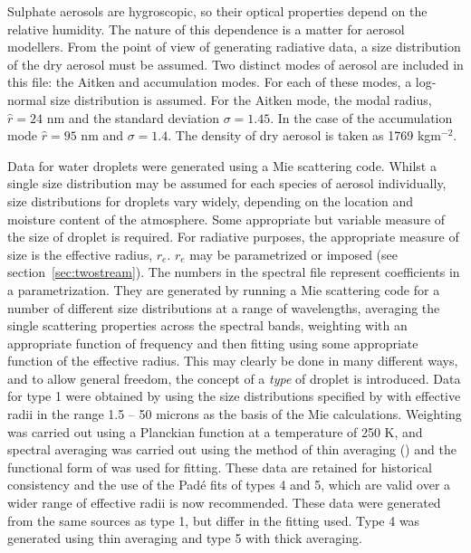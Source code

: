 \begin{enumerate}
Sulphate aerosols are hygroscopic, so their optical properties depend on
the relative humidity. The nature of this dependence is a matter for
aerosol modellers. From the point of view of generating radiative data,
a size distribution of the dry aerosol must be assumed. Two distinct
modes of aerosol are included in this file: the Aitken and accumulation
modes. For each of these modes, a log-normal size distribution is assumed.
For the Aitken mode, the modal radius, $\hat r = 24$ nm and the 
standard deviation $\sigma=1.45$. In the case of the accumulation mode
$\hat r = 95$ nm and $\sigma=1.4$. The density of dry aerosol is taken
as 1769 kgm${}^{-2}$.

Data for water droplets were generated using a Mie scattering code. 
Whilst a single size distribution may be assumed for each species
of aerosol individually, size distributions for droplets vary widely,
depending on the location and moisture content of the atmosphere. Some
appropriate but variable measure of the size of droplet is required.
For radiative purposes, the
appropriate measure of size is the effective radius, $r_e$. $r_e$
may be parametrized or imposed (see section~\ref{sec:twostream}). The numbers in the
spectral file represent coefficients in a parametrization. They
are generated by running a Mie scattering code for a number of different
size distributions at a range of wavelengths, averaging the single
scattering properties across the spectral bands, weighting with an
appropriate function of frequency and then fitting using some appropriate
function of the effective radius. This may clearly be done in many
different ways, and to allow general freedom, the concept of a {\em
type} of droplet is introduced.  Data for type 1 were obtained by
using the size distributions specified by \citet{Rockel91} 
with effective radii in the range 1.5 -- 50 microns 
as the basis of the Mie calculations. Weighting
was carried out using a Planckian function at a temperature of 250 K,
and spectral averaging was carried out using the method of 
thin averaging (\citet{Edwards96rc}) and
the functional form of \citet{Slingo82} was used for fitting. 
These data are retained for historical consistency and the use of
the Pad\'e fits of types 4 and 5, which are valid over a wider range
of effective radii is now recommended. These data were generated from 
the same sources as type 1, but differ in the fitting used. Type 4
was generated using thin averaging and type 5 with thick averaging.


\end{enumerate}
